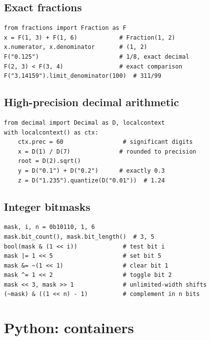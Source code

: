 \subsection{Exact fractions}
\begin{lstlisting}[label=py:fractions]
from fractions import Fraction as F
x = F(1, 3) + F(1, 6)            # Fraction(1, 2)
x.numerator, x.denominator       # (1, 2)
F("0.125")                       # 1/8, exact decimal
F(2, 3) < F(3, 4)                # exact comparison
F("3.14159").limit_denominator(100)  # 311/99
\end{lstlisting}

\subsection{High-precision decimal arithmetic}
\begin{lstlisting}[label=py:decimal]
from decimal import Decimal as D, localcontext
with localcontext() as ctx:
    ctx.prec = 60                 # significant digits
    x = D(1) / D(7)              # rounded to precision
    root = D(2).sqrt()
    y = D("0.1") + D("0.2")      # exactly 0.3
    z = D("1.235").quantize(D("0.01"))  # 1.24
\end{lstlisting}

\subsection{Integer bitmasks}
\begin{lstlisting}[label=py:bits]
mask, i, n = 0b10110, 1, 6
mask.bit_count(), mask.bit_length()  # 3, 5
bool(mask & (1 << i))             # test bit i
mask |= 1 << 5                    # set bit 5
mask &= ~(1 << 1)                 # clear bit 1
mask ^= 1 << 2                    # toggle bit 2
mask << 3, mask >> 1              # unlimited-width shifts
(~mask) & ((1 << n) - 1)          # complement in n bits
\end{lstlisting}

\section{Python: containers}

